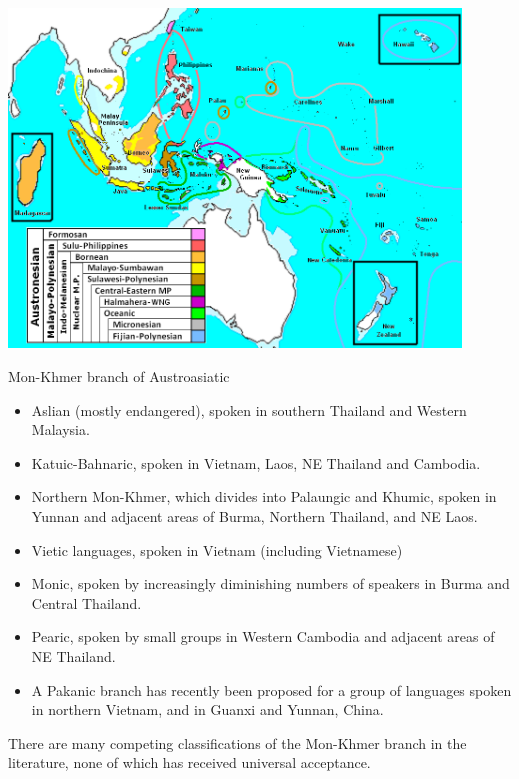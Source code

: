 \documentclass{beamer}
\begin{document}
\begin{frame}
  
\includegraphics[width=0.9\textwidth]{pics/image4.png}
\end{frame}

\begin{frame}{Mon-Khmer branch of Austroasiatic}
\begin{itemize}
\item  Aslian (mostly endangered), spoken in southern Thailand and Western
Malaysia.

\item Katuic-Bahnaric, spoken in Vietnam, Laos, NE Thailand and Cambodia.

\item Northern Mon-Khmer, which divides into Palaungic and Khumic, spoken in
Yunnan and adjacent areas of Burma, Northern Thailand, and NE Laos.

\item Vietic languages, spoken in Vietnam (including Vietnamese)

\item Monic, spoken by increasingly diminishing numbers of speakers in Burma
and Central Thailand.

\item Pearic, spoken by small groups in Western Cambodia and adjacent areas
of NE Thailand.

\item A Pakanic branch has recently been proposed for a group of languages
spoken in northern Vietnam, and in Guanxi and Yunnan, China.

\end{itemize}
  
There are many competing classifications of the Mon-Khmer branch in the
literature, none of which has received universal acceptance.
\end{frame}
\end{document}
